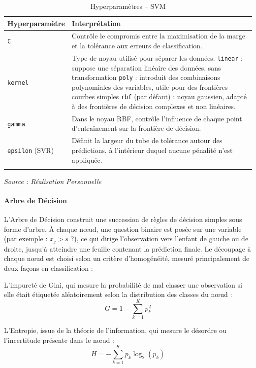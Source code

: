 \documentclass[a4paper,12pt, oneside]{article}
\begin{document}
\begin{longtable}{|m{5cm}|m{12cm}|}
\hline
\textbf{Hyperparamètre} & \textbf{Interprétation} \\
\hline
\texttt{C} & Contrôle le compromis entre la maximisation de la marge et la tolérance aux erreurs de classification. \\
\hline
\texttt{kernel} & Type de noyau utilisé pour séparer les données. \newline \texttt{linear} : suppose une séparation linéaire des données, sans transformation \newline \texttt{poly} : introduit des combinaisons polynomiales des variables, utile pour des frontières courbes simples \newline \texttt{rbf} (par défaut) : noyau gaussien, adapté à des frontières de décision complexes et non linéaires. \\
\hline
\texttt{gamma} & Dans le noyau RBF, contrôle l'influence de chaque point d'entraînement sur la frontière de décision. \\
\hline
\texttt{epsilon} (SVR) & Définit la largeur du tube de tolérance autour des prédictions, à l'intérieur duquel aucune pénalité n'est appliquée. \\
\hline
\caption{Hyperparamètres -- SVM}
\end{longtable}
\begin{center}
\vspace{-0.85cm}
\textit{Source : Réalisation Personnelle}
\end{center}

\paragraph{Arbre de Décision\\}
L'Arbre de Décision construit une succession de règles de décision simples sous forme d'arbre. À chaque nœud, une question binaire est posée sur une variable (par exemple : $x_j > s$ ?), ce qui dirige l'observation vers l'enfant de gauche ou de droite, jusqu'à atteindre une feuille contenant la prédiction finale. Le découpage à chaque nœud est choisi selon un critère d'homogénéité, mesuré principalement de deux façons en classification :

L'impureté de Gini, qui mesure la probabilité de mal classer une observation si elle était étiquetée aléatoirement selon la distribution des classes du nœud :
\[
G = 1 - \sum_{k=1}^{K} p_k^2
\]

L'Entropie, issue de la théorie de l'information, qui mesure le désordre ou l'incertitude présente dans le nœud :
\[
H = - \sum_{k=1}^{K} p_k \log_2(p_k)
\]
\end{document}
